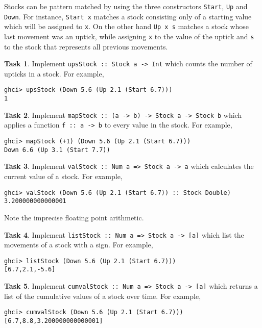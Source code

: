 \documentclass{article}[12pt]
\theoremstyle{definition}
\newtheorem{task}{Task}
\begin{document}
Stocks can be pattern matched by using the three constructors \verb|Start|, \verb|Up| and \verb|Down|. For instance, \verb|Start x| matches a stock consisting only of a starting value which will be assigned to \verb|x|. On the other hand \verb|Up x s| matches a stock whose last movement was an uptick, while assigning \verb|x| to the value of the uptick and \verb|s| to the stock that represents all previous movements.

\begin{task}
    Implement \verb|upsStock :: Stock a -> Int| which counts the number of upticks in a stock. For example,
    \begin{verbatim}
ghci> upsStock (Down 5.6 (Up 2.1 (Start 6.7)))
1\end{verbatim}
\end{task}

\begin{task}
    Implement \verb|mapStock :: (a -> b) -> Stock a -> Stock b| which applies a function \verb|f :: a -> b| to every value in the stock. For example,
    \begin{verbatim}
ghci> mapStock (+1) (Down 5.6 (Up 2.1 (Start 6.7)))
Down 6.6 (Up 3.1 (Start 7.7))\end{verbatim}
\end{task}

\begin{task}
    Implement \verb|valStock :: Num a => Stock a -> a| which calculates the current value of a stock.  
    For example,
    \begin{verbatim}
ghci> valStock (Down 5.6 (Up 2.1 (Start 6.7)) :: Stock Double)
3.200000000000001\end{verbatim}
    Note the imprecise floating point arithmetic.
\end{task}

\begin{task}
    Implement \verb|listStock :: Num a => Stock a -> [a]| which list the movements of a stock with a sign.  
    For example,
    \begin{verbatim}
ghci> listStock (Down 5.6 (Up 2.1 (Start 6.7)))
[6.7,2.1,-5.6]\end{verbatim}
\end{task}

\begin{task}
    Implement \verb|cumvalStock :: Num a => Stock a -> [a]| which returns a list of the cumulative values of a stock over time.  
    For example,
    \begin{verbatim}
ghci> cumvalStock (Down 5.6 (Up 2.1 (Start 6.7)))
[6.7,8.8,3.200000000000001]\end{verbatim}
\end{task}
\end{document}
